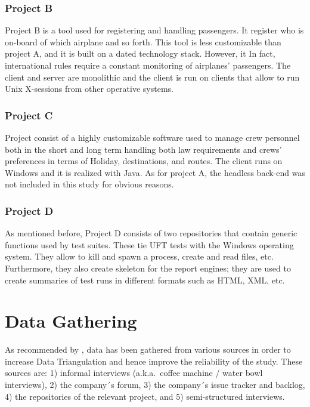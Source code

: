 \subsubsection{Project B}
Project B is a tool used for registering and handling passengers. It register who is on-board of which airplane and so forth. This tool is less customizable than project A, and it is built on a dated technology stack. However, it In fact, international rules require a constant monitoring of airplanes' passengers. The client and server are monolithic and the client is run on clients that allow to run Unix X-sessions from other operative systems.

\subsubsection{Project C}
Project  consist of a highly customizable software used to manage crew personnel both in the short and long term handling both law requirements and crews' preferences in terms of Holiday, destinations, and routes. The client runs on Windows and it is realized with Java. As for project A, the headless back-end was not included in this study for obvious reasons.

\subsubsection{Project D}
As mentioned before, Project D consists of two repositories that contain generic functions used by test suites. These tie UFT tests with the Windows operating system. They allow to kill and spawn a process, create and read files, etc. Furthermore, they also create skeleton for the report engines; they are used to create summaries of test runs in different formats such as HTML, XML, etc.

%
%
%
%

%
%
%
%
\section{Data Gathering}
As recommended by \cite{case_study_guide,case_study_software_engineering}, data has been gathered from various sources in order to increase Data Triangulation and hence improve the reliability of the study. These sources are: 1) informal interviews (a.k.a.\ coffee machine / water bowl interviews), 2) the company´s forum, 3) the company´s issue tracker and backlog, 4) the repositories of the relevant project, and 5) semi-structured interviews.

